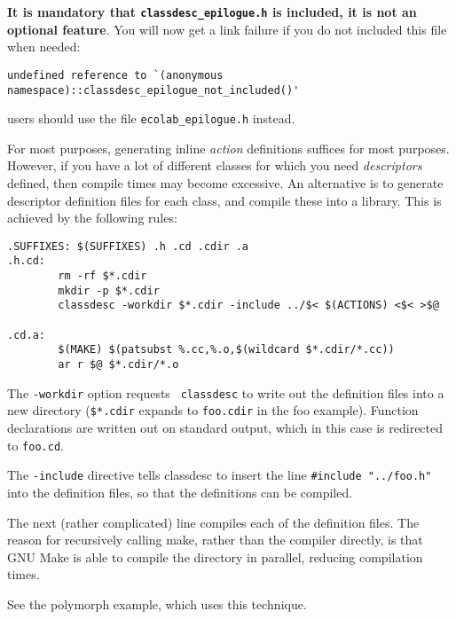 {\bf It is mandatory that \verb+classdesc_epilogue.h+\label{classdesc_epilogue} is included, it is not
  an optional feature}. You will now get a link failure if you do not
included this file when needed:
\begin{verbatim}
undefined reference to `(anonymous namespace)::classdesc_epilogue_not_included()'
\end{verbatim}
\EcoLab{} users should use the file
  \verb+ecolab_epilogue.h+ instead.

\label{library-method} 

For most purposes, generating inline {\em action} definitions suffices
for most purposes. However, if you have a lot of different classes for
which you need {\em descriptors} defined, then compile times may become
excessive. An alternative is to generate descriptor definition files for each
class, and compile these into a library. This is
achieved by the following rules:

\begin{verbatim}
.SUFFIXES: $(SUFFIXES) .h .cd .cdir .a
.h.cd:
        rm -rf $*.cdir 
        mkdir -p $*.cdir      
        classdesc -workdir $*.cdir -include ../$< $(ACTIONS) <$< >$@

.cd.a:
        $(MAKE) $(patsubst %.cc,%.o,$(wildcard $*.cdir/*.cc))
        ar r $@ $*.cdir/*.o
\end{verbatim}

The {\tt -workdir} option requests {\tt
classdesc} to write out the definition files into a
new directory (\verb+$*.cdir+ %
 expands to {\tt foo.cdir} in the foo
example). Function declarations are written out on standard output,
which in this case is redirected to {\tt foo.cd}.

The {\tt -include} directive tells classdesc to insert
the line \verb+#include "../foo.h"+ into the definition files, so that
the definitions can be compiled.

The next (rather complicated) line compiles each of the definition
files. The reason for recursively calling make, rather than the compiler
directly, is that GNU Make is able to compile the directory in
parallel, reducing compilation times. 

See the polymorph example, which uses this technique.

\label{cmake-method} 


